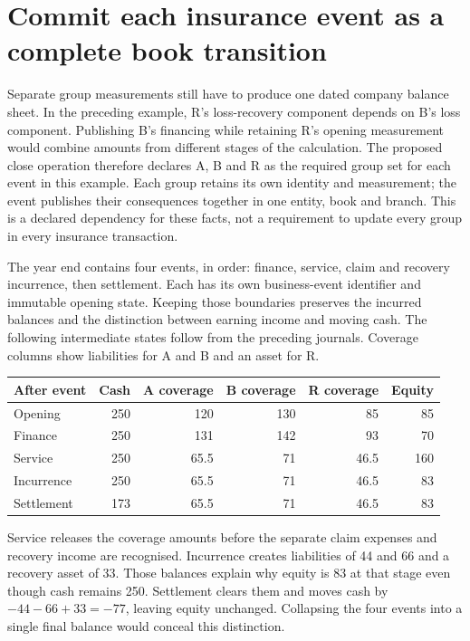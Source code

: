 \section{Commit each insurance event as a complete book transition}
\label{sec:insurance-atomic}

Separate group measurements still have to produce one dated company balance
sheet. In the preceding example, R's loss-recovery component depends on B's
loss component. Publishing B's financing while retaining R's opening
measurement would combine amounts from different stages of the calculation.
The proposed close operation therefore declares A, B and R as the required
group set for each event in this example. Each group retains its own identity
and measurement; the event publishes their consequences together in one
entity, book and branch. This is a declared dependency for these facts, not a
requirement to update every group in every insurance transaction.

The year end contains four events, in order: finance, service, claim and
recovery incurrence, then settlement. Each has its own business-event
identifier and immutable opening state. Keeping those boundaries preserves
the incurred balances and the distinction between earning income and moving
cash. The following intermediate states follow from the preceding journals.
Coverage columns show liabilities for A and B and an asset for R.
\begin{center}
\begin{tabular}{lrrrrr}
\toprule
After event & Cash & A coverage & B coverage & R coverage & Equity\\
\midrule
Opening & 250 & 120 & 130 & 85 & 85\\
Finance & 250 & 131 & 142 & 93 & 70\\
Service & 250 & 65.5 & 71 & 46.5 & 160\\
Incurrence & 250 & 65.5 & 71 & 46.5 & 83\\
Settlement & 173 & 65.5 & 71 & 46.5 & 83\\
\bottomrule
\end{tabular}
\end{center}
Service releases the coverage amounts before the separate claim expenses
and recovery income are recognised. Incurrence creates liabilities of 44
and 66 and a recovery asset of 33. Those balances explain why equity is 83
at that stage even though cash remains 250. Settlement clears them and
moves cash by \(-44-66+33=-77\), leaving equity unchanged. Collapsing the
four events into a single final balance would conceal this distinction.


